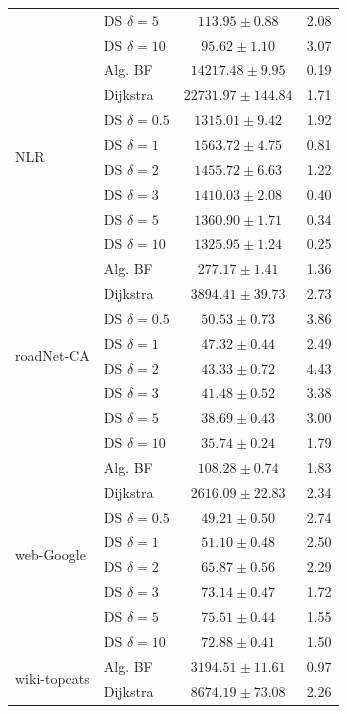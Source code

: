 \documentclass[a4paper]{article}
\begin{document}
\begin{table}[h!]
\begin{minipage}{0.48\textwidth}
\begin{tabular}{llcc}
    & DS $\delta=5$ & $113.95 \pm 0.88$ & 2.08 \\
    & DS $\delta=10$ & $95.62 \pm 1.10$ & 3.07 \\
\midrule
\multirow{8}{*}{NLR}
    & Alg. BF & $14217.48 \pm 9.95$ & 0.19 \\
    & Dijkstra & $22731.97 \pm 144.84$ & 1.71 \\
    & DS $\delta=0.5$ & $1315.01 \pm 9.42$ & 1.92 \\
    & DS $\delta=1$ & $1563.72 \pm 4.75$ & 0.81 \\
    & DS $\delta=2$ & $1455.72 \pm 6.63$ & 1.22 \\
    & DS $\delta=3$ & $1410.03 \pm 2.08$ & 0.40 \\
    & DS $\delta=5$ & $1360.90 \pm 1.71$ & 0.34 \\
    & DS $\delta=10$ & $1325.95 \pm 1.24$ & 0.25 \\
\midrule
\multirow{8}{*}{roadNet-CA}
    & Alg. BF & $277.17 \pm 1.41$ & 1.36 \\
    & Dijkstra & $3894.41 \pm 39.73$ & 2.73 \\
    & DS $\delta=0.5$ & $50.53 \pm 0.73$ & 3.86 \\
    & DS $\delta=1$ & $47.32 \pm 0.44$ & 2.49 \\
    & DS $\delta=2$ & $43.33 \pm 0.72$ & 4.43 \\
    & DS $\delta=3$ & $41.48 \pm 0.52$ & 3.38 \\
    & DS $\delta=5$ & $38.69 \pm 0.43$ & 3.00 \\
    & DS $\delta=10$ & $35.74 \pm 0.24$ & 1.79 \\
\midrule
\multirow{8}{*}{web-Google}
    & Alg. BF & $108.28 \pm 0.74$ & 1.83 \\
    & Dijkstra & $2616.09 \pm 22.83$ & 2.34 \\
    & DS $\delta=0.5$ & $49.21 \pm 0.50$ & 2.74 \\
    & DS $\delta=1$ & $51.10 \pm 0.48$ & 2.50 \\
    & DS $\delta=2$ & $65.87 \pm 0.56$ & 2.29 \\
    & DS $\delta=3$ & $73.14 \pm 0.47$ & 1.72 \\
    & DS $\delta=5$ & $75.51 \pm 0.44$ & 1.55 \\
    & DS $\delta=10$ & $72.88 \pm 0.41$ & 1.50 \\
\midrule
\multirow{8}{*}{wiki-topcats}
    & Alg. BF & $3194.51 \pm 11.61$ & 0.97 \\
    & Dijkstra & $8674.19 \pm 73.08$ & 2.26 \\

\end{tabular}
\end{minipage}
\end{table}
\end{document}

